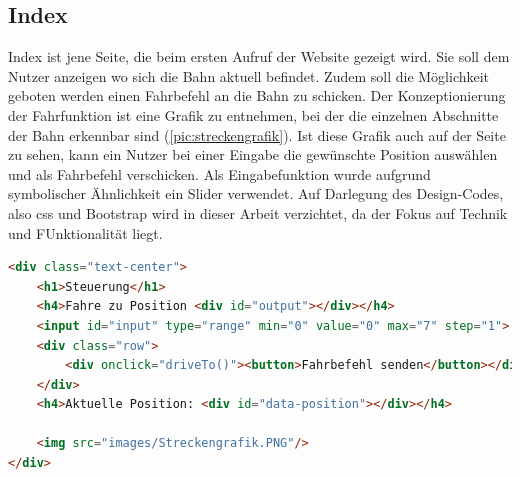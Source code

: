 \subsection{Index}
Index ist jene Seite, die beim ersten Aufruf der Website gezeigt wird. Sie soll dem Nutzer anzeigen wo sich die Bahn aktuell befindet. Zudem soll die Möglichkeit geboten werden einen Fahrbefehl an die Bahn zu schicken. Der Konzeptionierung der Fahrfunktion ist eine Grafik zu entnehmen, bei der die einzelnen Abschnitte der Bahn erkennbar sind (\autoref{pic:streckengrafik}). Ist diese Grafik auch auf der Seite zu sehen, kann ein Nutzer bei einer Eingabe die gewünschte Position auswählen und als Fahrbefehl verschicken. Als Eingabefunktion wurde aufgrund symbolischer Ähnlichkeit ein Slider verwendet. Auf Darlegung des Design-Codes, also css und Bootstrap wird in dieser Arbeit verzichtet, da der Fokus auf Technik und FUnktionalität liegt. 
\vspace{1cm}

\begin{lstlisting}[language=html, style=dhpaperdefault]
<div class="text-center">
    <h1>Steuerung</h1>
    <h4>Fahre zu Position <div id="output"></div></h4>
    <input id="input" type="range" min="0" value="0" max="7" step="1">
    <div class="row">
        <div onclick="driveTo()"><button>Fahrbefehl senden</button></div>
    </div>
    <h4>Aktuelle Position: <div id="data-position"></div></h4>

	<img src="images/Streckengrafik.PNG"/>
</div>
\end{lstlisting}
\vspace{1cm}

